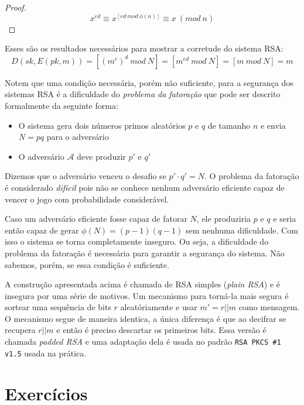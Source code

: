 \begin{proof}
  \begin{displaymath}
    x^{ed} \equiv x^{[ed\ mod\ \phi(n)]} \equiv x\ (mod\ n)
  \end{displaymath}
\end{proof}

Esses são os resultados necessários para mostrar a corretude do sistema RSA:
\begin{displaymath}
D(sk, E(pk, m)) = [(m^e)^d\ mod\ N] = [m^{ed}\ mod\ N] = [m\ mod\ N] = m  
\end{displaymath}

Notem que uma condição necessária, porém não suficiente, para a segurança dos sistemas RSA é a dificuldade do {\em problema da fatoração} que pode ser descrito formalmente da seguinte forma:
\begin{itemize}
\item O sistema gera dois números primos aleatórios $p$ e $q$ de tamanho $n$ e envia $N = pq$ para o adversário
\item O adversário $\mathcal{A}$ deve produzir $p'$ e $q'$
\end{itemize}

Dizemos que o adversário venceu o desafio se $p' \cdot q' = N$.
O problema da fatoração é considerado {\em difícil} pois não se conhece nenhum adversário eficiente capaz de vencer o jogo com probabilidade considerável.

Caso um adversário eficiente fosse capaz de fatorar $N$, ele produziria $p$ e $q$ e seria então capaz de gerar $\phi(N) = (p-1)(q-1)$ sem nenhuma dificuldade.
Com isso o sistema se torna completamente inseguro.
Ou seja, a dificuldade do problema da fatoração é necessária para garantir a segurança do sistema.
Não sabemos, porém, se essa condição é suficiente.

A construção apresentada acima é chamada de RSA simples ({\em plain RSA}) e é insegura por uma série de motivos.
Um mecanismo para torná-la mais segura é sortear uma sequência de bits $r$ aleatóriamente e usar $m' = r||m$ como mensagem.
O mecanismo segue de maneira identica, a única diferença é que ao decifrar se recupera $r||m$ e então é preciso descartar os primeiros bits.
Essa versão é chamada {\em padded RSA} e uma adaptação dela é usada no padrão {\tt RSA PKCS \#1 v1.5} usada na prática.


\section{Exercícios}
\label{sec:exercicios}


\begin{exercicio}
\end{exercicio}

